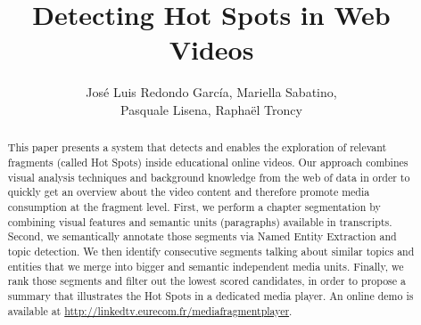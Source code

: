 \documentclass{llncs}
\begin{document}
\frontmatter          %
\pagestyle{headings}  %
\mainmatter              %

\title{Detecting Hot Spots in Web Videos}
\author{Jos\'e Luis Redondo Garc\'ia, Mariella Sabatino,\\ Pasquale Lisena, Rapha\"el Troncy}

\maketitle              %


\begin{abstract}
This paper presents a system that detects and enables the exploration of relevant fragments (called Hot Spots) inside educational online videos. Our approach combines visual analysis techniques and background knowledge from the web of data in order to quickly get an overview about the video content and therefore promote media consumption at the fragment level. First, we perform a chapter segmentation by combining visual features and semantic units (paragraphs) available in transcripts. Second, we semantically annotate those segments via Named Entity Extraction and topic detection. We then identify consecutive segments talking about similar topics and entities that we merge into bigger and semantic independent media units. Finally, we rank those segments and filter out the lowest scored candidates, in order to propose a summary that illustrates the Hot Spots in a dedicated media player. An online demo is available at \url{http://linkedtv.eurecom.fr/mediafragmentplayer}.

\end{abstract}

\end{document}
